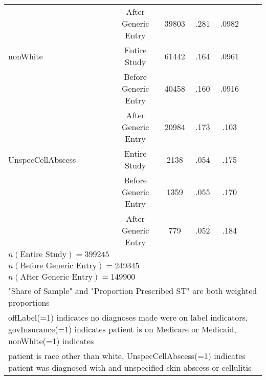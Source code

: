 \begin{table}[htbp]
\begin{tabular}{l*{6}{c}}
                          &     After Generic Entry&      39803 &      .281&     .0982\\
[1em]
nonWhite                  &     Entire Study&             61442&      .164&     .0961\\
                          &     Before Generic Entry&     40458&      .160&     .0916\\
                          &     After Generic Entry&      20984&      .173&     .103\\
[1em]
UnspecCellAbscess         &     Entire Study&             2138 &      .054&     .175\\
                          &     Before Generic Entry&     1359 &      .055&     .170\\
                          &     After Generic Entry&      779  &      .052&     .184\\
\hline
$n(\text{Entire Study}) = 399245$\\
$n(\text{Before Generic Entry}) = 249345$\\
$n(\text{After Generic Entry}) = 149900$\\
\hline\hline
\multicolumn{7}{l}{"Share of Sample" and "Proportion Prescribed ST" are both weighted proportions}\\
\multicolumn{7}{l}{offLabel(=1) indicates no diagnoses made were on label indicators, govInsurance(=1) indicates patient is on Medicare or Medicaid, nonWhite(=1) indicates}\\
\multicolumn{7}{l}{patient is race other than white, UnspecCellAbscess(=1) indicates patient was diagnosed with and unspecified skin abscess or cellulitis}\\
\end{tabular}
\label{tab:Table4.2}
\end{table}
